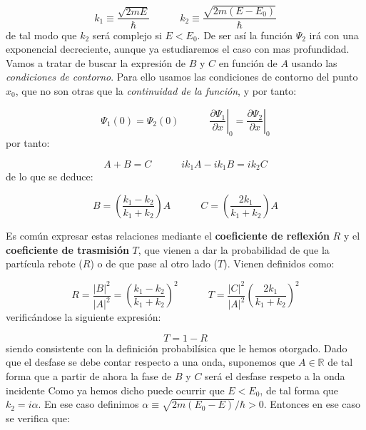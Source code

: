 \documentclass[12pt]{article}
\newcommand{\parentesis}[1]{\left( #1  \right)}
\newcommand{\parciales}[2]{\frac{\partial #1}{\partial #2}}
\newcommand{\tquad}{\quad \quad \quad}
\begin{document}
\begin{equation}
k_1 \equiv \dfrac{\sqrt{2mE}}{\hbar} \tquad k_2 \equiv \dfrac{\sqrt{2m(E-E_0)}}{\hbar}
\end{equation}
de tal modo que $k_2$ será complejo si $E<E_0$. De ser así la función $\Psi_2$ irá con una exponencial decreciente, aunque ya estudiaremos el caso con mas profundidad. Vamos a tratar de buscar la expresión de $B$ y $C$ en función de $A$ usando las \textit{condiciones de contorno}. Para ello usamos las condiciones de contorno del punto $x_0$, que no son otras que la \textit{continuidad de la función}, y por tanto:

\begin{equation}
\Psi_1 (0) = \Psi_2 (0) \tquad \left. \parciales{\Psi_1}{x} \right|_0 = \left. \parciales{\Psi_2}{x} \right|_0
\end{equation}
por tanto:

\begin{equation}
A + B = C \tquad i k_1 A - i k_1 B = i k_2 C
\end{equation}
de lo que se deduce:

\begin{equation}
B = \parentesis{\dfrac{k_1-k_2}{k_1+k_2}}A \tquad C =  \parentesis{\dfrac{2k_1}{k_1+k_2}}A
\end{equation}


Es común expresar estas relaciones mediante el \textbf{coeficiente de reflexión} $R$  y el \textbf{coeficiente de trasmisión}  $T$, que vienen a dar la probabilidad de que la partícula rebote ($R$) o de que pase al otro lado ($T$). Vienen definidos como:

\begin{equation}
R = \dfrac{|B|^2}{|A|^2} = \parentesis{\dfrac{k_1-k_2}{k_1 + k_2}}^2 \tquad T = \dfrac{|C|^2}{|A|^2} \parentesis{\dfrac{2k_1}{k_1 + k_2}}^2 
\end{equation}
verificándose la siguiente expresión:

\begin{equation}
T = 1 - R
\end{equation}
siendo consistente con la definición probabilísica que le hemos otorgado. Dado que el desfase se debe contar respecto a una onda, suponemos que $A \in \mathbb{R}$ de tal forma que a partir de ahora la fase de $B$ y $C$ será el desfase respeto a la onda incidente Como ya hemos dicho puede ocurrir que $E<E_0$, de tal forma que $k_2 =  i \alpha$. En ese caso definimos $\alpha \equiv \sqrt{2m (E_0-E)} / \hbar >0$. Entonces en ese caso se verifica que:
\end{document}
